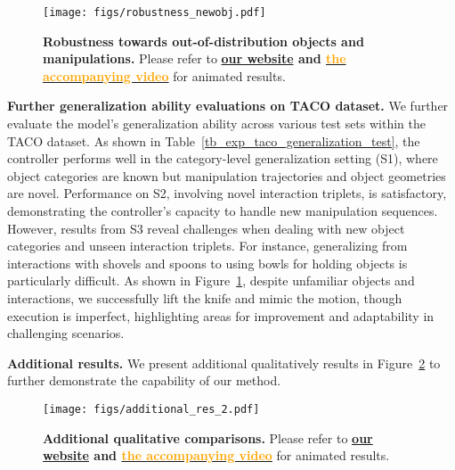 \begin{figure}[ht]
  \centering
  \texttt{[image: figs/robustness\_newobj.pdf]}
  \caption{
  \textbf{Robustness towards out-of-distribution objects and manipulations. }
  Please refer to \textbf{\href{https://projectwebsite7.github.io/gene-dex-manip/}{our website} and {\href{https://projectwebsite7.github.io/gene-dex-manip/static/videos-lowres/video_7.mp4}{\textcolor{orange}{the accompanying video}}}} for animated results.
  }
  \label{fig_res_robustness_newobj}
\end{figure}


\noindent\textbf{Further generalization ability evaluations on TACO dataset.}
We further evaluate the model's generalization ability across various test sets within the TACO dataset. As shown in Table~\ref{tb_exp_taco_generalization_test}, the controller performs well in the category-level generalization setting (S1), where object categories are known but manipulation trajectories and object geometries are novel. Performance on S2, involving novel interaction triplets, is satisfactory, demonstrating the controller's capacity to handle new manipulation sequences. However, results from S3 reveal challenges when dealing with new object categories and unseen interaction triplets. For instance, generalizing from interactions with shovels and spoons to using bowls for holding objects is particularly difficult. As shown in Figure~\ref{fig_res_robustness_newobj}, despite unfamiliar objects and interactions, we successfully lift the knife and mimic the motion, though execution is imperfect, highlighting areas for improvement and adaptability in challenging scenarios.

\noindent\textbf{Additional results.} We present additional qualitatively results in Figure~\ref{fig_additional_res} to further demonstrate the capability of our method. 


\begin{figure}[h]
  \centering
  \texttt{[image: figs/additional\_res\_2.pdf]}
  \caption{
  \textbf{Additional qualitative comparisons. }
  Please refer to \textbf{\href{https://projectwebsite7.github.io/gene-dex-manip/}{our website} and {\href{https://projectwebsite7.github.io/gene-dex-manip/static/videos-lowres/video_7.mp4}{\textcolor{orange}{the accompanying video}}}} for animated results.
  }
  \label{fig_additional_res}
\end{figure}





